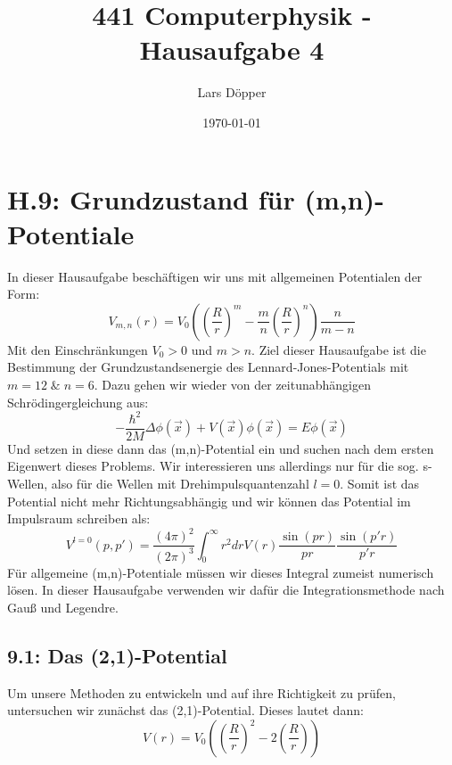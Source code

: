 \documentclass[11pt,a4paper]{article}
\author{Lars Döpper}
\date{\today}
\title{441 Computerphysik - Hausaufgabe 4}
\begin{document}
\maketitle

\section*{H.9: Grundzustand für (m,n)-Potentiale}
In dieser Hausaufgabe beschäftigen wir uns mit allgemeinen Potentialen der Form:
\begin{equation}
V_{m,n}(r) = V_0\left( \left(\frac{R}{r}\right)^{m} -\frac{m}{n}\left(\frac{R}{r}\right)^{n} \right)\frac{n}{m-n}
\end{equation}
Mit den Einschränkungen $V_0>0$ und $m>n$. Ziel dieser Hausaufgabe ist  die Bestimmung der Grundzustandsenergie des Lennard-Jones-Potentials mit $m=12 \; \&\; n=6$. Dazu gehen wir wieder von der zeitunabhängigen Schrödingergleichung aus:
\begin{equation}\label{eq:schrödinger}
	-\frac{\hbar^2}{2M}\Delta\phi(\vec{x}) + V(\vec{x})\phi(\vec{x}) = E\phi(\vec{x})
\end{equation}
Und setzen in diese dann das (m,n)-Potential ein und suchen nach dem ersten Eigenwert dieses Problems.
Wir interessieren uns allerdings nur für die sog. s-Wellen, also für die Wellen mit Drehimpulsquantenzahl $l=0$. Somit ist das Potential nicht mehr Richtungsabhängig und wir können das Potential im  Impulsraum schreiben als:
\begin{equation}
	V^{l=0}(p, p')=\frac{(4\pi)^2}{(2\pi)^3}\int_{0}^{\infty}r^2drV(r)\frac{\sin(pr)}{pr}\frac{\sin(p'r)}{p'r}
\end{equation}
Für allgemeine (m,n)-Potentiale müssen wir dieses Integral zumeist numerisch lösen. In dieser Hausaufgabe verwenden wir dafür die Integrationsmethode nach Gauß und Legendre.
\subsection*{9.1: Das  (2,1)-Potential}
Um unsere Methoden zu entwickeln und auf ihre Richtigkeit zu prüfen, untersuchen wir zunächst das  (2,1)-Potential.  Dieses lautet dann:
\begin{equation}\label{eq:21pot}
	V(r) = V_0\left(\left(\frac{R}{r}\right)^2 -2\left(\frac{R}{r}\right)\right)
\end{equation}
\end{document}

